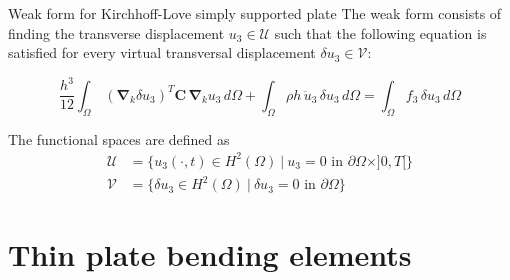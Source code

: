\documentclass[aspectratio=169]{beamer}
\begin{document}
{
\color{white}
\begin{frame}{Weak form for Kirchhoff-Love simply supported plate}
  The weak form consists of finding the transverse displacement $u_{3}\in \mathcal U$ such that the following equation is satisfied for every virtual transversal displacement $\delta u_3\in \mathcal V$:
  \begin{block}{}
    \[
      \frac{h^3}{12}\int_\Omega \, (\boldsymbol{\nabla}_k \delta u_3)^T\mathbf C \, \boldsymbol{\nabla}_k u_3  \, d\Omega + \int_\Omega \rho h\, \ddot u_3 \, \delta u_3 \, d\Omega = \int_\Omega f_3\, \delta u_3 \, d\Omega
    \]
  \end{block}

  The functional spaces are defined as
  \begin{align*}
    \mathcal U & =\big\{u_3(\cdot,t)\in H^2(\Omega)\ |\ u_3=0\text{ in } \partial\Omega\times]0,T[\big\} \\[0.1cm]
    \mathcal V & =\big\{\delta u_3\in H^2(\Omega)\ |\ \delta u_3=0\text{ in } \partial\Omega\big\}
  \end{align*}
\end{frame}
}

\section{Thin plate bending elements}
\end{document}
